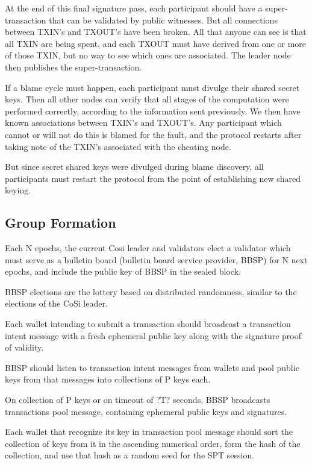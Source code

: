 \documentclass[a4paper, 10pt, conference]{ieeeconf}
\begin{document}
At the end of this final signature pass, each participant should have a super-transaction that can be validated by public witnesses. But all connections between TXIN's and TXOUT's have been broken. All that anyone can see is that all TXIN are being spent, and each TXOUT must have derived from one or more of those TXIN, but no way to see which ones are associated. The leader node then publishes the super-transaction.

If a blame cycle must happen, each participant must divulge their shared secret keys. Then all other nodes can verify that all stages of the computation were performed correctly, according to the information sent previously. We then have known associations between TXIN's and TXOUT's. Any participant which cannot or will not do this is blamed for the fault, and the protocol restarts after taking note of the TXIN's associated with the cheating node.

But since secret shared keys were divulged during blame discovery, all participants must restart the protocol from the point of establishing new shared keying.

\subsection{Group Formation}
Each N epochs, the current Cosi leader and validators elect a validator which must serve as a bulletin board (bulletin board service provider, BBSP) for N next epochs, and include the public key of BBSP in the sealed block.

BBSP elections are the lottery based on distributed randomness, similar to the elections of the CoSi leader.

Each wallet intending to submit a transaction should broadcast a transaction intent message with a fresh ephemeral public key along with the signature proof of validity.

BBSP should listen to transaction intent messages from wallets and pool public keys from that messages into collections of P keys each.

On collection of P keys or on timeout of ?T? seconds, BBSP broadcasts transactions pool message, containing ephemeral public keys and signatures.

Each wallet that recognize its key in transaction pool message should sort the collection of keys from it in the ascending numerical order, form the hash of the collection, and use that hash as a random seed for the SPT session.
\end{document}
